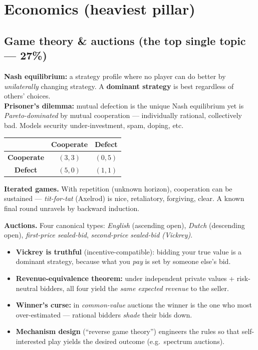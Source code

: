 \documentclass[11pt,a4paper]{article}
\begin{document}
\hrulefill

\section{Economics (heaviest pillar)}

\subsection{Game theory \& auctions (the top single topic --- 27\%)}

\begin{must}
\textbf{Nash equilibrium:} a strategy profile where no player can do better by \emph{unilaterally} changing strategy. A \textbf{dominant strategy} is best regardless of others' choices.\\[3pt]
\textbf{Prisoner's dilemma:} mutual defection is the unique Nash equilibrium yet is \emph{Pareto-dominated} by mutual cooperation --- individually rational, collectively bad. Models security under-investment, spam, doping, etc.
\end{must}

\begin{center}
\begin{tabular}{c|cc}
 & \textbf{Cooperate} & \textbf{Defect} \\
\hline
\textbf{Cooperate} & $(3,3)$ & $(0,5)$ \\
\textbf{Defect} & $(5,0)$ & $(1,1)$ \\
\end{tabular}
\end{center}

\textbf{Iterated games.} With repetition (unknown horizon), cooperation can be sustained --- \emph{tit-for-tat} (Axelrod) is nice, retaliatory, forgiving, clear. A known final round unravels by backward induction.

\begin{useful}
\textbf{Auctions.} Four canonical types: \emph{English} (ascending open), \emph{Dutch} (descending open), \emph{first-price sealed-bid}, \emph{second-price sealed-bid (Vickrey)}.
\begin{itemize}[leftmargin=*,itemsep=1pt]
  \item \textbf{Vickrey is truthful} (incentive-compatible): bidding your true value is a dominant strategy, because what you \emph{pay} is set by someone else's bid.
  \item \textbf{Revenue-equivalence theorem:} under independent private values + risk-neutral bidders, all four yield the \emph{same expected revenue} to the seller.
  \item \textbf{Winner's curse:} in \emph{common-value} auctions the winner is the one who most over-estimated --- rational bidders \emph{shade} their bids down.
  \item \textbf{Mechanism design} (``reverse game theory'') engineers the rules so that self-interested play yields the desired outcome (e.g.\ spectrum auctions).
\end{itemize}
\end{useful}
\end{document}
